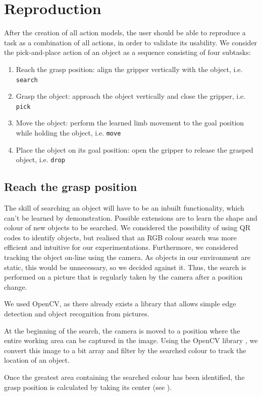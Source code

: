 \section{Reproduction}
After the creation of all action models, the user should be able to reproduce a task as a combination of all actions, in order to validate its usability.
We consider the pick-and-place action of an object as a sequence consisting of four subtasks:
\begin{enumerate}
\item Reach the grasp position: align the gripper vertically with the object, i.e.
\texttt{search}
\item Grasp the object: approach the object vertically and close the gripper, i.e.
\texttt{pick}
\item Move the object: perform the learned limb movement to the goal position while holding the object, i.e.
\texttt{move}
\item Place the object on its goal position: open the gripper to release the grasped object, i.e.
\texttt{drop}
\end{enumerate}

\subsection{Reach the grasp position}\label{Object Search}
The skill of searching an object will have to be an inbuilt functionality, which can't be learned by demonstration.
Possible extensions are to learn the shape and colour of new objects to be searched.
We considered the possibility of using QR codes to identify objects, but realised that an RGB colour search was more efficient and intuitive for our experimentations.
Furthermore, we considered tracking the object on-line using the camera.
As objects in our environment are static, this would be unnecessary, so we decided against it.
Thus, the search is performed on a picture that is regularly taken by the camera after a position change.

We used OpenCV, as there already exists a library that allows simple edge detection and object recognition from pictures.

At the beginning of the search, the camera is moved to a position where the entire working area can be captured in the image.
Using the OpenCV library \cite{opencv}, we convert this image to a bit array and filter by the searched colour to track the location of an object.

Once the greatest area containing the searched colour has been identified, the grasp position is calculated by taking its center (see ).

